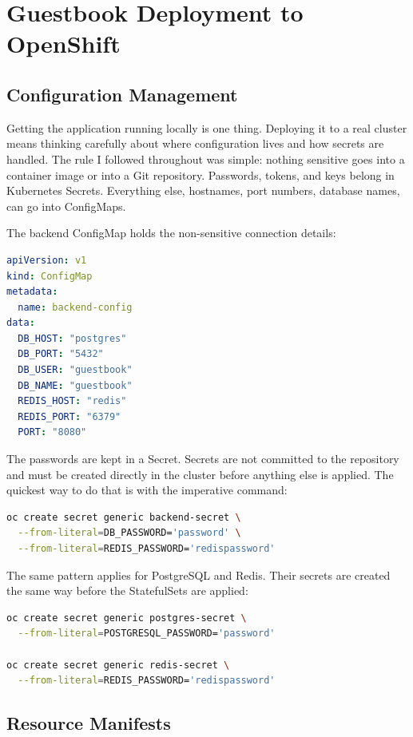\section{Guestbook Deployment to OpenShift}

\subsection{Configuration Management}

Getting the application running locally is one thing. Deploying it to a real cluster
means thinking carefully about where configuration lives and how secrets are handled.
The rule I followed throughout was simple: nothing sensitive goes into a container image
or into a Git repository. Passwords, tokens, and keys belong in Kubernetes Secrets.
Everything else, hostnames, port numbers, database names, can go into ConfigMaps.

The backend ConfigMap holds the non-sensitive connection details:

\begin{lstlisting}[language=yaml]
apiVersion: v1
kind: ConfigMap
metadata:
  name: backend-config
data:
  DB_HOST: "postgres"
  DB_PORT: "5432"
  DB_USER: "guestbook"
  DB_NAME: "guestbook"
  REDIS_HOST: "redis"
  REDIS_PORT: "6379"
  PORT: "8080"
\end{lstlisting}

The passwords are kept in a Secret. Secrets are not committed to the repository and
must be created directly in the cluster before anything else is applied. The quickest
way to do that is with the imperative command:

\begin{lstlisting}[language=bash]
oc create secret generic backend-secret \
  --from-literal=DB_PASSWORD='password' \
  --from-literal=REDIS_PASSWORD='redispassword'
\end{lstlisting}

The same pattern applies for PostgreSQL and Redis. Their secrets are created the same
way before the StatefulSets are applied:

\begin{lstlisting}[language=bash]
oc create secret generic postgres-secret \
  --from-literal=POSTGRESQL_PASSWORD='password'

oc create secret generic redis-secret \
  --from-literal=REDIS_PASSWORD='redispassword'
\end{lstlisting}

\subsection{Resource Manifests}

